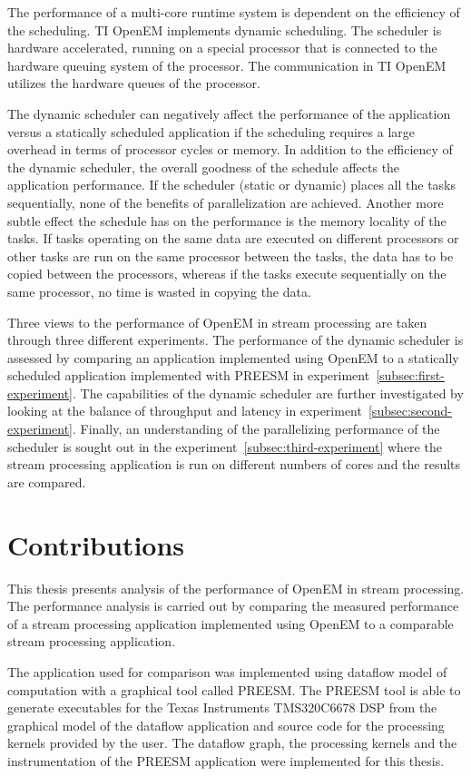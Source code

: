 The performance of a multi-core runtime system is dependent on the efficiency of the scheduling. TI OpenEM implements dynamic scheduling. The scheduler is hardware accelerated, running on a special processor that is connected to the hardware queuing system of the processor. The communication in TI OpenEM utilizes the hardware queues of the processor.

The dynamic scheduler can negatively affect the performance of the application versus a statically scheduled application if the scheduling requires a large overhead in terms of processor cycles or memory. In addition to the efficiency of the dynamic scheduler, the overall goodness of the schedule affects the application performance. If the scheduler (static or dynamic) places all the tasks sequentially, none of the benefits of parallelization are achieved. Another more subtle effect the schedule has on the performance is the memory locality of the tasks. If tasks operating on the same data are executed on different processors or other tasks are run on the same processor between the tasks, the data has to be copied between the processors, whereas if the tasks execute sequentially on the same processor, no time is wasted in copying the data.

Three views to the performance of OpenEM in stream processing are taken through three different experiments. The performance of the dynamic scheduler is assessed by comparing an application implemented using OpenEM to a statically scheduled application implemented with PREESM in experiment~\ref{subsec:first-experiment}. The capabilities of the dynamic scheduler are further investigated by looking at the balance of throughput and latency in experiment~\ref{subsec:second-experiment}. Finally, an understanding of the parallelizing performance of the scheduler is sought out in the experiment~\ref{subsec:third-experiment} where the stream processing application is run on different numbers of cores and the results are compared.

\section{Contributions}
\label{section:contributions}
This thesis presents analysis of the performance of OpenEM in stream processing. The performance analysis is carried out by comparing the measured performance of a stream processing application implemented using OpenEM to a comparable stream processing application.

The application used for comparison was implemented using dataflow model of computation with a graphical tool called PREESM. The PREESM tool is able to generate executables for the Texas Instruments TMS320C6678 DSP from the graphical model of the dataflow application and source code for the processing kernels provided by the user. The dataflow graph, the processing kernels and the instrumentation of the PREESM application were implemented for this thesis.

